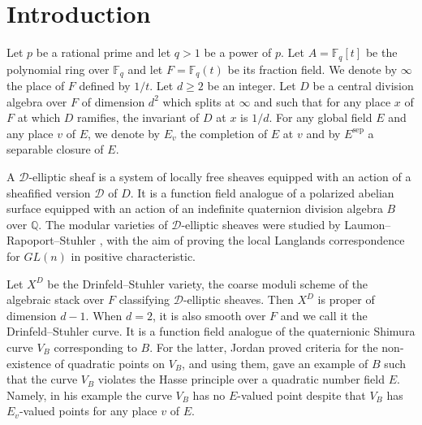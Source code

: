 \documentclass[10pt]{amsart}
\theoremstyle{plain}
\theoremstyle{definition}
\newcommand{\sep}{\mathrm{sep}}
\newcommand{\bF}{\mathbb{F}}
\newcommand{\bQ}{\mathbb{Q}}
\newcommand{\sD}{\mathscr{D}}
\begin{document}







\section{Introduction}\label{Intro}

Let $p$ be a rational prime and let $q>1$ be a power of $p$. 
Let $A=\bF_q[t]$ be the polynomial 
ring over $\bF_q$ and let $F=\bF_q(t)$ be its fraction field.
We denote by $\infty$ the place of $F$ defined by $1/t$. 
Let $d\geq 2$ be an integer. Let $D$ be a central division algebra over $F$ of dimension $d^2$ which splits at $\infty$ 
and such that for any place $x$ of $F$ at which $D$ ramifies, the invariant of $D$ 
at $x$ is $1/d$.
For any global field $E$ and any place $v$ of $E$, we denote by $E_v$
the completion of $E$ at $v$ and by $E^\sep$ a separable closure of $E$.

A $\sD$-elliptic sheaf is a system of locally free sheaves equipped with an action of a sheafified version $\sD$ of $D$.
It is a function field analogue of a polarized abelian surface 
equipped with an action of an indefinite quaternion division algebra $B$ over $\bQ$.
The modular varieties of $\sD$-elliptic sheaves were studied by Laumon--Rapoport--Stuhler \cite{LRS}, with the aim of proving the local Langlands correspondence
for $\mathit{GL}(n)$ in positive characteristic. 

Let $X^D$ be the Drinfeld--Stuhler variety, the coarse moduli scheme of the algebraic stack over $F$ classifying $\sD$-elliptic sheaves. 
Then $X^D$ is proper of dimension $d-1$. 
When $d=2$, it is also smooth over $F$ and we call it the Drinfeld--Stuhler curve. 
It is a function field analogue of 
the quaternionic Shimura curve $V_B$ corresponding to $B$. For the latter, Jordan \cite{Jordan} 
proved criteria for the non-existence of quadratic points on $V_B$, 
and using them,
gave an example of $B$ such that the curve $V_B$ violates the Hasse principle 
over a quadratic number field $E$. Namely, in his example the curve $V_B$ has 
no $E$-valued 
point 
despite that $V_B$ has $E_v$-valued points for any place $v$ of $E$.
\end{document}
